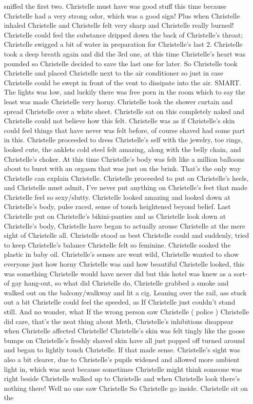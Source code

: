 \documentclass[12pt]{book}
\begin{document}
sniffed the first two. Christelle must have was good stuff this time because Christelle had a very strong odor, which was a good sign! Plus when Christelle inhaled Christelle and Christelle felt very sharp and Christelle really burned! Christelle could feel the substance dripped down the back of Christelle's throat; Christelle swigged a bit of water in preparation for Christelle's last 2. Christelle took a deep breath again and did the 3rd one, at this time Christelle's heart was pounded so Christelle decided to save the last one for later. So Christelle took Christelle and placed Christelle next to the air conditioner so just in case Christelle could be swept in front of the vent to dissipate into the air. SMART. The lights was low, and luckily there was free porn in the room which to say the least was made Christelle very horny. Christelle took the shower curtain and spread Christelle over a white sheet. Christelle sat on this completely naked and Christelle could not believe how this felt. Christelle was as if Christelle's skin could feel things that have never was felt before, of course shaved had some part in this. Christelle proceeded to dress Christelle's self with the jewelry, toe rings, looked cute, the anklets cold steel felt amazing, along with the belly chain, and Christelle's choker. At this time Christelle's body was felt like a million balloons about to burst with an orgasm that was just on the brink. That's the only way Christelle can explain Christelle. Christelle proceeded to put on Christelle's heels, and Christelle must admit, I've never put anything on Christelle's feet that made Christelle feel so sexy/slutty. Christelle looked amazing and looked down at Christelle's body, pulse raced, sense of touch heightened beyond belief. Last Christelle put on Christelle's bikini-panties and as Christelle look down at Christelle's body, Christelle have began to actually arouse Christelle at the mere sight of Christelle all. Christelle stood as best Christelle could and suddenly, tried to keep Christelle's balance Christelle felt so feminine. Christelle soaked the plastic in baby oil. Christelle's senses are went wild, Christelle wanted to show everyone just how horny Christelle was and how beautiful Christelle looked, this was something Christelle would have never did but this hotel was knew as a sort-of gay hang-out, so what did Christelle do, Christelle grabbed a smoke and walked out on the balcony/walkway and lit a cig. Leaning over the rail, ass stuck out a bit Christelle could feel the speeded, as If Christelle just couldn't stand still. And no wonder, what If the wrong person saw Christelle ( police ) Christelle did care, that's the neat thing about Meth, Christelle's inhibitions disappear when Christelle affected Christelle! Christelle's skin was felt tingly like the goose bumps on Christelle's freshly shaved skin have all just popped off turned around and began to lightly touch Christelle. If that made sense. Christelle's sight was also a bit clearer, due to Christelle's pupils widened and allowed more ambient light in, which was neat because sometimes Christelle might think someone was right beside Christelle walked up to Christelle and when Christelle look there's nothing there! Well no one saw Christelle So Christelle go inside. Christelle sit on the 
\end{document}
